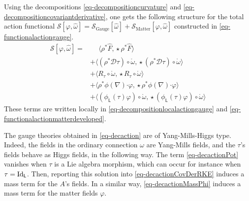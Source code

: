 \documentclass[number]{elsarticle}
\theoremstyle{definition}
\theoremstyle{remark}
\numberwithin{equation}{section}
\begin{document}
Using the decompositions \eqref{eq-decompositioncurvature} and \eqref{eq-decompositioncovariantderivative}, one gets the following structure for the total action functional ${\mathcal{S}}[\varphi,{\widehat{\omega}}] = {\mathcal{S}}_\text{Gauge}[{\widehat{\omega}}] + {\mathcal{S}}_\text{Matter}[\varphi,{\widehat{\omega}}]$ constructed in \eqref{eq-functionalactiongauge}. 
\begin{subequations}
\label{eq-decaction}
\begin{align}
{\mathcal{S}}[\varphi,{\widehat{\omega}}] = 
&\mathbin{\phantom{+}} \langle \rho^\ast {{\widehat{F}}}, {\mathop{\star}} \rho^\ast {{\widehat{F}}} \rangle 
\label{eq-decactionYM}
\\[2pt]
&+ \langle (\rho^\ast {{\mathcal D}} {\tau})\circ {{\mathring{{\omega}}}}, {\mathop{\star}} (\rho^\ast {{\mathcal D}} {\tau})\circ {{\mathring{{\omega}}}} \rangle 
\label{eq-decactionCovDerRKE}
\\[2pt]
&+ \langle R_{\tau} \circ {{\mathring{{\omega}}}}, {\mathop{\star}} R_{\tau} \circ {{\mathring{{\omega}}}} \rangle
\label{eq-decactionPot}
\\[2pt]
&+ \langle \rho^\ast\phi(\nabla){\mathord{\cdot}} \varphi, {\mathop{\star}} \rho^\ast\phi(\nabla){\mathord{\cdot}} \varphi \rangle
\label{eq-decactionCovDerPhi}
\\[2pt]
&+ \langle (\phi_{{{{\mathbf{\mathsf{{L}}}}}}} ({\tau}) \varphi) \circ {{\mathring{{\omega}}}}, {\mathop{\star}} (\phi_{{{{\mathbf{\mathsf{{L}}}}}}} ({\tau}) \varphi) \circ {{\mathring{{\omega}}}} \rangle
\label{eq-decactionMassPhi}
\end{align}
\end{subequations}
These terms are written locally in \eqref{eq-decompositionlocalactiongauge} and \eqref{eq-functionalactionmatterdeveloped}.

The gauge theories obtained in \eqref{eq-decaction} are of Yang-Mills-Higgs type. Indeed, the fields in the ordinary connection $\omega$ are Yang-Mills fields, and the ${\tau}$'s fields behave as Higgs fields, in the following way. The term \eqref{eq-decactionPot} vanishes when ${\tau}$ is a Lie algebra morphism, which can occur for instance when ${\tau} = {{\text{\textup{Id}}}}_{{{{\mathbf{\mathsf{{L}}}}}}}$. Then, reporting this solution into \eqref{eq-decactionCovDerRKE} induces a mass term for the $A$'s fields. In a similar way, \eqref{eq-decactionMassPhi} induces a mass term for the matter fields $\varphi$. 
\end{document}
